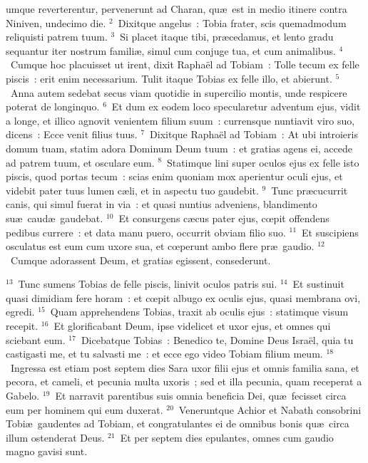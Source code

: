 \bchapter
{}umque reverterentur, pervenerunt ad Charan, qu\ae\ est in medio itinere contra Niniven, undecimo die.
${}^{2}$~Dixitque angelus~: Tobia frater, scis quemadmodum reliquisti patrem tuum.
${}^{3}$~Si placet itaque tibi, pr\ae cedamus, et lento gradu sequantur iter nostrum famili\ae , simul cum conjuge tua, et cum animalibus.
${}^{4}$~Cumque hoc placuisset ut irent, dixit Rapha\"el ad Tobiam~: Tolle tecum ex felle piscis~: erit enim necessarium. Tulit itaque Tobias ex felle illo, et abierunt.
${}^{5}$~Anna autem sedebat secus viam quotidie in supercilio montis, unde respicere poterat de longinquo.
${}^{6}$~Et dum ex eodem loco specularetur adventum ejus, vidit a longe, et illico agnovit venientem filium suum~: currensque nuntiavit viro suo, dicens~: Ecce venit filius tuus.
${}^{7}$~Dixitque Rapha\"el ad Tobiam~: At ubi introieris domum tuam, statim adora Dominum Deum tuum~: et gratias agens ei, accede ad patrem tuum, et osculare eum.
${}^{8}$~Statimque lini super oculos ejus ex felle isto piscis, quod portas tecum~: scias enim quoniam mox aperientur oculi ejus, et videbit pater tuus lumen c\ae li, et in aspectu tuo gaudebit.
${}^{9}$~Tunc pr\ae cucurrit canis, qui simul fuerat in via~: et quasi nuntius adveniens, blandimento su\ae\ caud\ae\ gaudebat.
${}^{10}$~Et consurgens c\ae cus pater ejus, cœpit offendens pedibus currere~: et data manu puero, occurrit obviam filio suo.
${}^{11}$~Et suscipiens osculatus est eum cum uxore sua, et cœperunt ambo flere pr\ae\ gaudio.
${}^{12}$~Cumque adorassent Deum, et gratias egissent, consederunt.


${}^{13}$~Tunc sumens Tobias de felle piscis, linivit oculos patris sui.
${}^{14}$~Et sustinuit quasi dimidiam fere horam~: et cœpit albugo ex oculis ejus, quasi membrana ovi, egredi.
${}^{15}$~Quam apprehendens Tobias, traxit ab oculis ejus~: statimque visum recepit.
${}^{16}$~Et glorificabant Deum, ipse videlicet et uxor ejus, et omnes qui sciebant eum.
${}^{17}$~Dicebatque Tobias~: Benedico te, Domine Deus Isra\"el, quia tu castigasti me, et tu salvasti me~: et ecce ego video Tobiam filium meum.
${}^{18}$~Ingressa est etiam post septem dies Sara uxor filii ejus et omnis familia sana, et pecora, et cameli, et pecunia multa uxoris~; sed et illa pecunia, quam receperat a Gabelo.
${}^{19}$~Et narravit parentibus suis omnia beneficia Dei, qu\ae\ fecisset circa eum per hominem qui eum duxerat.
${}^{20}$~Veneruntque Achior et Nabath consobrini Tobi\ae\ gaudentes ad Tobiam, et congratulantes ei de omnibus bonis qu\ae\ circa illum ostenderat Deus.
${}^{21}$~Et per septem dies epulantes, omnes cum gaudio magno gavisi sunt.

